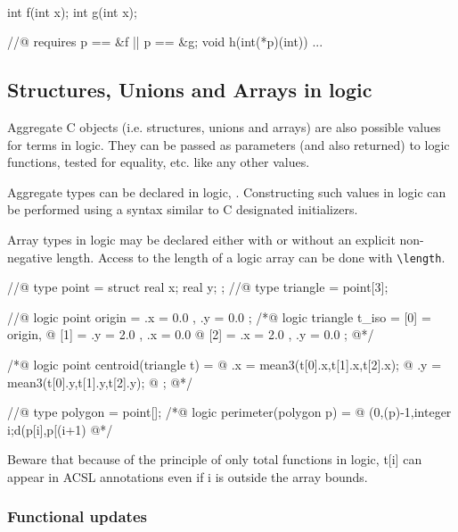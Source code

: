 \begin{example}
~
\begin{listing-nonumber}
int f(int x);
int g(int x);

//@ requires p == &f || p == &g;
void h(int(*p)(int)) {
...
}
\end{listing-nonumber}
\end{example}

\subsection{Structures, Unions and Arrays in logic}
\label{sec:aggregate}

Aggregate C objects (i.e. structures, unions and arrays) are also
possible values for terms in logic. They can be passed as parameters (and
also returned) to logic functions, tested for equality, etc. like any
other values.

Aggregate types can be declared in logic, 
. Constructing such values in logic can be
performed using a syntax similar to C designated initializers.

\begin{example}
Array types in logic may be declared either with or without an
explicit non-negative length. Access to the length of a logic array
can be done with \lstinline|\length|.

\begin{listing-nonumber}
//@ type point = struct { real x; real y; };
//@ type triangle = point[3];

//@ logic point origin = { .x = 0.0 , .y = 0.0 };
/*@ logic triangle t_iso = { [0] = origin,
  @                          [1] = { .y = 2.0 , .x = 0.0 }
  @                          [2] = { .x = 2.0 , .y = 0.0 }};
  @*/

/*@ logic point centroid(triangle t) = {
  @    .x = mean3(t[0].x,t[1].x,t[2].x);
  @    .y = mean3(t[0].y,t[1].y,t[2].y);
  @ };
  @*/

//@ type polygon = point[];
/*@ logic perimeter(polygon p) =
  @   \sum(0,\length(p)-1,\lambda integer i;d(p[i],p[(i+1) %
  @*/
\end{listing-nonumber}
Beware that because of the principle of only total functions in logic,
t[i] can appear in ACSL annotations even if i is outside the array bounds.

\end{example}

\subsubsection{Functional updates}

